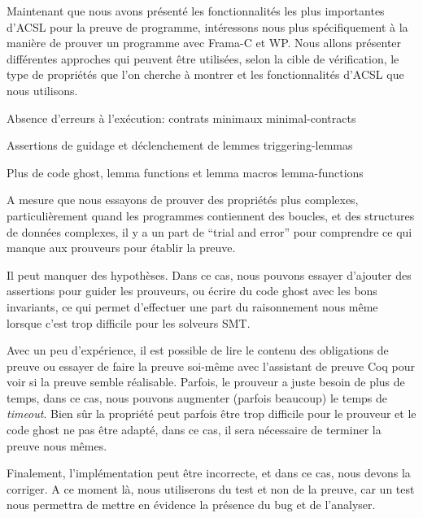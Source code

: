 Maintenant que  nous avons présenté les fonctionnalités les plus importantes
d'ACSL pour la preuve de programme, intéressons nous plus spécifiquement à la
manière de prouver un programme avec Frama-C et WP. Nous allons présenter
différentes approches qui peuvent être utilisées, selon la cible de vérification,
le type de propriétés que l'on cherche à montrer et les fonctionnalités d'ACSL
que nous utilisons.


\begin{levelTwo}
  {Absence d'erreurs à l'exécution: contrats minimaux}
  {minimal-contracts}
\end{levelTwo}

\begin{levelTwo}
  {Assertions de guidage et déclenchement de lemmes}
  {triggering-lemmas}
\end{levelTwo}

\begin{levelTwo}
  {Plus de code ghost, lemma functions et lemma macros}
  {lemma-functions}
\end{levelTwo}



\horizontalLine
\newpage


A mesure que nous essayons de prouver des propriétés plus complexes,
particulièrement quand les programmes contiennent des boucles, et des
structures de données complexes, il y a un part de ``trial and error''
pour comprendre ce qui manque aux prouveurs pour établir la preuve.


Il peut manquer des hypothèses. Dans ce cas, nous pouvons essayer d'ajouter
des assertions pour guider les prouveurs, ou écrire du code ghost avec les
bons invariants, ce qui permet d'effectuer une part du raisonnement nous
même lorsque c'est trop difficile pour les solveurs SMT.


Avec un peu d'expérience, il est possible de lire le contenu des
obligations de preuve ou essayer de faire la preuve soi-même avec
l'assistant de preuve Coq pour voir si la preuve semble réalisable.
Parfois, le prouveur a juste besoin de plus de temps, dans ce cas, nous
pouvons augmenter (parfois beaucoup) le temps de \textit{timeout}. Bien
sûr la propriété peut parfois être trop difficile pour le prouveur et
le code ghost ne pas être adapté, dans ce cas, il sera nécessaire de
terminer la preuve nous mêmes.


Finalement, l'implémentation peut être incorrecte, et dans ce cas,
nous devons la corriger. A ce moment là, nous utiliserons du test et
non de la preuve, car un test nous permettra de mettre en évidence la
présence du bug et de l'analyser.
